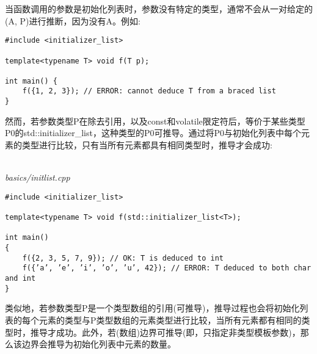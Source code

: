 当函数调用的参数是初始化列表时，参数没有特定的类型，通常不会从一对给定的(A, P)进行推断，因为没有A。例如:

\begin{lstlisting}[style=styleCXX]
#include <initializer_list>

template<typename T> void f(T p);

int main() {
	f({1, 2, 3}); // ERROR: cannot deduce T from a braced list
}
\end{lstlisting}

然而，若参数类型P在除去引用，以及const和volatile限定符后，等价于某些类型P0的std::initializer\_list，这种类型的P0可推导。通过将P0与初始化列表中每个元素的类型进行比较，只有当所有元素都具有相同类型时，推导才会成功:

\hspace*{\fill} \\ %
\noindent
\textit{basics/initlist.cpp}
\begin{lstlisting}[style=styleCXX]
#include <initializer_list>

template<typename T> void f(std::initializer_list<T>);

int main()
{
	f({2, 3, 5, 7, 9}); // OK: T is deduced to int
	f({’a’, ’e’, ’i’, ’o’, ’u’, 42}); // ERROR: T deduced to both char and int
}
\end{lstlisting}

类似地，若参数类型P是一个类型数组的引用(可推导)，推导过程也会将初始化列表的每个元素的类型与P类型数组的元素类型进行比较，当所有元素都有相同的类型时，推导才成功。此外，若(数组)边界可推导(即，只指定非类型模板参数)，那么该边界会推导为初始化列表中元素的数量。












































